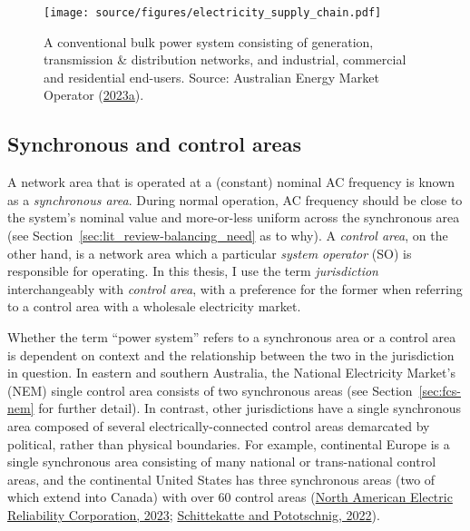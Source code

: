 \documentclass[12pt,a4paper,]{report}
\begin{document}
\begin{figure}
\hypertarget{fig:elec_supply_chain}{%
\centering
\texttt{[image: source/figures/electricity\_supply\_chain.pdf]}
\caption[The bulk power system as an electricity supply chain]{A
conventional bulk power system consisting of generation, transmission \&
distribution networks, and industrial, commercial and residential
end-users. Source: Australian Energy Market Operator
(\protect\hyperlink{ref-australianenergymarketoperatorIndustryOverview2023}{2023a}).}\label{fig:elec_supply_chain}
}
\end{figure}

\hypertarget{synchronous-and-control-areas}{%
\subsection{Synchronous and control
areas}\label{synchronous-and-control-areas}}

A network area that is operated at a (constant) nominal AC frequency is
known as a \emph{synchronous area}. During normal operation, AC
frequency should be close to the system's nominal value and more-or-less
uniform across the synchronous area (see
Section~\ref{sec:lit_review-balancing_need} as to why). A \emph{control
area}, on the other hand, is a network area which a particular
\emph{system operator} (SO) is responsible for operating. In this
thesis, I use the term \emph{jurisdiction} interchangeably with
\emph{control area}, with a preference for the former when referring to
a control area with a wholesale electricity market.

Whether the term ``power system'' refers to a synchronous area or a
control area is dependent on context and the relationship between the
two in the jurisdiction in question. In eastern and southern Australia,
the National Electricity Market's (NEM) single control area consists of
two synchronous areas (see Section~\ref{sec:fcs-nem} for further
detail). In contrast, other jurisdictions have a single synchronous area
composed of several electrically-connected control areas demarcated by
political, rather than physical boundaries. For example, continental
Europe is a single synchronous area consisting of many national or
trans-national control areas, and the continental United States has
three synchronous areas (two of which extend into Canada) with over 60
control areas
(\protect\hyperlink{ref-northamericanelectricreliabilitycorporationNERCInterconnections2023}{North
American Electric Reliability Corporation, 2023};
\protect\hyperlink{ref-schittekatteDistributedEnergyResources2022}{Schittekatte
and Pototschnig, 2022}).
\end{document}
